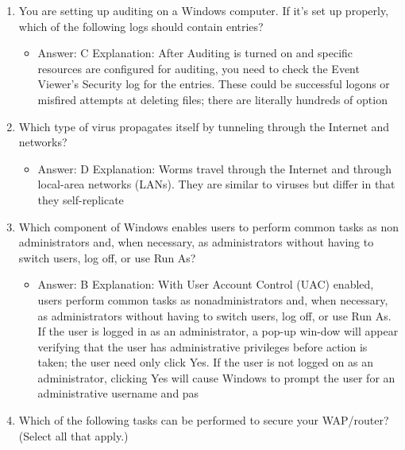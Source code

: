 \documentclass{article}
\begin{document}
\begin{enumerate}
     \item You are setting up auditing on a Windows computer. If it’s set up
properly, which of the following logs should contain entries?
     \begin{itemize}
         \item   Answer:   C                Explanation:        After Auditing is turned on and specific resources are configured for auditing, you need to check the Event Viewer’s Security log for the entries. These could be successful logons or misfired attempts at deleting files; there are literally hundreds of option
     \end{itemize}
     \item Which type of virus propagates itself by tunneling through the
Internet and networks?
     \begin{itemize}
         \item   Answer:   D                Explanation:        Worms travel through the Internet and through local-area networks (LANs). They are similar to viruses but differ in that they self-replicate
     \end{itemize}
     \item Which component of Windows enables users to perform common
tasks as non administrators and, when necessary, as administrators
without having to switch users, log off, or use Run As?
     \begin{itemize}
         \item   Answer:   B                Explanation:        With User Account Control (UAC) enabled, users perform common tasks as nonadministrators and, when necessary, as administrators without having to switch users, log off, or use Run As. If the user is logged in as an administrator, a pop-up win-dow will appear verifying that the user has administrative privileges before action is taken; the user need only click Yes. If the user is not logged on as an administrator, clicking Yes will cause Windows to prompt the user for an administrative username and pas
     \end{itemize}
     \item Which of the following tasks can be performed to secure your
WAP/router? (Select all that apply.)
     \begin{itemize}

\end{itemize}
\end{enumerate}
\end{document}
